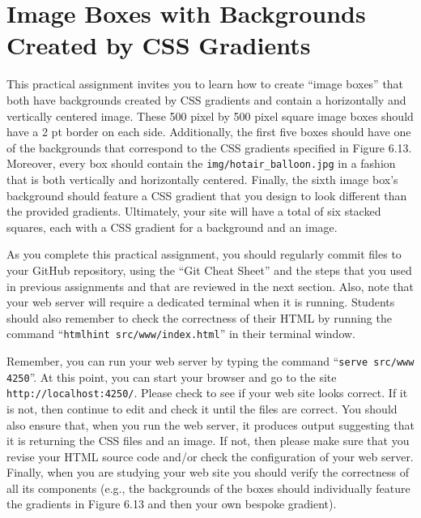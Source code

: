 \documentclass[11pt]{article}
\newcommand{\command}[1]{``\lstinline{#1}''}
\newcommand{\program}[1]{\lstinline{#1}}
\newcommand{\url}[1]{\lstinline{#1}}
\begin{document}
\section*{Image Boxes with Backgrounds Created by CSS Gradients}



This practical assignment invites you to learn how to create ``image boxes''
that both have backgrounds created by CSS gradients and contain a horizontally
and vertically centered image. These 500 pixel by 500 pixel square image boxes
should have a 2 pt border on each side. Additionally, the first five boxes
should have one of the backgrounds that correspond to the CSS gradients
specified in Figure 6.13. Moreover, every box should contain the
\program{img/hotair_balloon.jpg} in a fashion that is both vertically and
horizontally centered. Finally, the sixth image box's background should feature
a CSS gradient that you design to look different than the provided gradients.
Ultimately, your site will have a total of six stacked squares, each with a CSS
gradient for a background and an image.

As you complete this practical assignment, you should regularly commit files to
your GitHub repository, using the ``Git Cheat Sheet'' and the steps that you
used in previous assignments and that are reviewed in the next section. Also,
note that your web server will require a dedicated terminal when it is running.
Students should also remember to check the correctness of their HTML by running
the command \command{htmlhint src/www/index.html} in their terminal window.


Remember, you can run your web server by typing the command \command{serve
src/www 4250}. At this point, you can start your browser and go to the site
\url{http://localhost:4250/}. Please check to see if your web site looks
correct. If it is not, then continue to edit and check it until the files are
correct. You should also ensure that, when you run the web server, it produces
output suggesting that it is returning the CSS files and an image. If not, then
please make sure that you revise your HTML source code and/or check the
configuration of your web server. Finally, when you are studying your web site
you should verify the correctness of all its components (e.g., the backgrounds
of the boxes should individually feature the gradients in Figure 6.13 and then
your own bespoke gradient).
\end{document}
